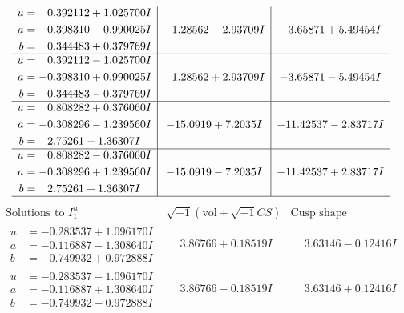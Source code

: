 \documentclass[1p]{elsarticle_modified}
\theoremstyle{definition}
\newcommand{\I}{\sqrt{-1}}
\begin{document}
$$\begin{array}{c|c|c}
\begin{aligned}
u &= \phantom{-}0.392112 + 1.025700 I \\
a &= -0.398310 - 0.990025 I \\
b &= \phantom{-}0.344483 + 0.379769 I\end{aligned}
 & \phantom{-}1.28562 - 2.93709 I & -3.65871 + 5.49454 I \\ \hline\begin{aligned}
u &= \phantom{-}0.392112 - 1.025700 I \\
a &= -0.398310 + 0.990025 I \\
b &= \phantom{-}0.344483 - 0.379769 I\end{aligned}
 & \phantom{-}1.28562 + 2.93709 I & -3.65871 - 5.49454 I \\ \hline\begin{aligned}
u &= \phantom{-}0.808282 + 0.376060 I \\
a &= -0.308296 - 1.239560 I \\
b &= \phantom{-}2.75261 - 1.36307 I\end{aligned}
 & -15.0919 + 7.2035 I & -11.42537 - 2.83717 I \\ \hline\begin{aligned}
u &= \phantom{-}0.808282 - 0.376060 I \\
a &= -0.308296 + 1.239560 I \\
b &= \phantom{-}2.75261 + 1.36307 I\end{aligned}
 & -15.0919 - 7.2035 I & -11.42537 + 2.83717 I\\
 \hline 
 \end{array}$$\newpage$$\begin{array}{c|c|c}  
\text{Solutions to }I^u_{1}& \I (\text{vol} + \sqrt{-1}CS) & \text{Cusp shape}\\
 \hline 
\begin{aligned}
u &= -0.283537 + 1.096170 I \\
a &= -0.116887 - 1.308640 I \\
b &= -0.749932 + 0.972888 I\end{aligned}
 & \phantom{-}3.86766 + 0.18519 I & \phantom{-}3.63146 - 0.12416 I \\ \hline\begin{aligned}
u &= -0.283537 - 1.096170 I \\
a &= -0.116887 + 1.308640 I \\
b &= -0.749932 - 0.972888 I\end{aligned}
 & \phantom{-}3.86766 - 0.18519 I & \phantom{-}3.63146 + 0.12416 I \\ \hline\begin{aligned}

\end{aligned}
\end{array}$$
\end{document}
